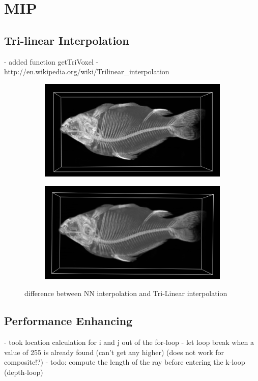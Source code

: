 \section{MIP}\label{sec:mip}

\subsection{Tri-linear Interpolation}\label{sec:tri_linear}
- added function getTriVoxel
- http://en.wikipedia.org/wiki/Trilinear_interpolation

\begin{figure}[h!]
    \centering
    \captionsetup{justification=centering,margin=0.5cm}
    \begin{subfigure}[t]{0.48\textwidth}
        \includegraphics[width=\textwidth]{img/fish_NN.png}
        \caption{ }
    \end{subfigure}
    \begin{subfigure}[t]{0.48\textwidth}
        \includegraphics[width=\textwidth]{img/fish_TriLin.png}
        \caption{ }
    \end{subfigure}
    \caption{difference between NN interpolation and Tri-Linear interpolation}
    \label{fig:trilinear}
\end{figure}

\subsection{Performance Enhancing}\label{sec:perf_enh}

- took location calculation for i and j out of the for-loop
- let loop break when a value of 255 is already found (can't get any higher) (does not work for composite!?)
- todo: compute the length of the ray before entering the k-loop (depth-loop)